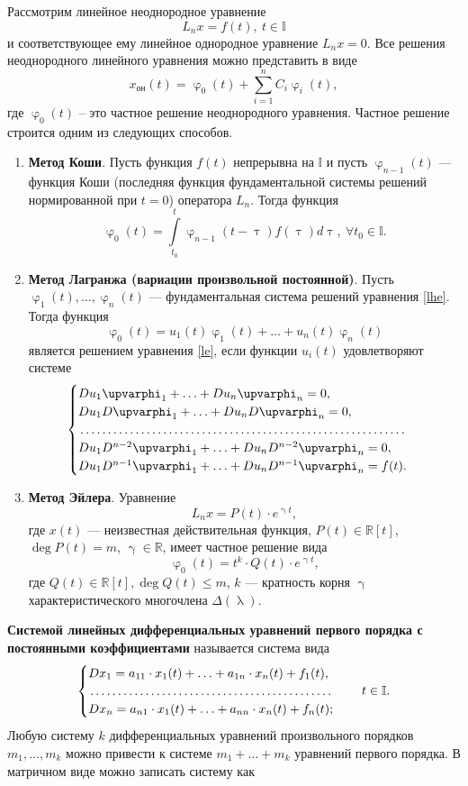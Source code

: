 \documentclass[a4paper, 12pt]{report}
\numberwithin{equation}{section}
\renewcommand{\varphi}{\upvarphi}
\renewcommand{\phi}{\upvarphi}
\renewcommand{\lambda}{\uplambda}
\begin{document}
	Рассмотрим линейное неоднородное уравнение 
	\begin{equation}
		\label{le}
		L_nx = f(t),\ t\in \mathbb{I}
	\end{equation} и соответствующее ему линейное однородное уравнение $L_nx = 0.$ Все решения неоднородного линейного уравнения можно представить в виде $$x_{\text{он}}(t) =\phi_0(t) + \sum_{i=1}^n C_i \phi_i(t),$$
	где $\phi_0(t)$ -- это частное решение неоднородного уравнения. Частное решение строится одним из следующих способов.
	\begin{enumerate}
		\item \textbf{Метод Коши}.
		Пусть функция $f(t)$ непрерывна на $\mathbb I$ и пусть $\varphi_{n-1}(t)$ --- функция Коши (последняя функция фундаментальной системы решений нормированной при $t=0$) оператора $L_n$. Тогда функция $$\phi_0(t) = \int\limits_{t_0}^{t}\varphi_{n-1}(t-\uptau) f(\uptau)d\uptau,\ \forall t_0 \in \mathbb I.$$
		\item \textbf{Метод Лагранжа (вариации произвольной постоянной)}.
		Пусть $\varphi_1(t),\ldots,\varphi_n(t)$ --- фундаментальная система решений уравнения \eqref{lhe}. Тогда функция $$\phi_0(t) = u_1(t)\varphi_1(t) + \ldots + u_n(t)\varphi_n(t)$$ является решением уравнения \eqref{le}, если функции $u_i(t)$ удовлетворяют системе $$\begin{cases}
			Du_1\varphi_1 + \ldots + Du_n\varphi_n = 0,\\
			Du_1D\varphi_1 + \ldots + Du_nD\varphi_n = 0,\\
			\dotfill\\
			Du_1D^{n-2}\varphi_1 + \ldots + Du_nD^{n-2}\varphi_n = 0,\\
			Du_1D^{n-1}\varphi_1 + \ldots + Du_nD^{n-1}\varphi_n = f(t).
		\end{cases}$$
		\item \textbf{Метод Эйлера}. Уравнение $$L_nx = P(t)\cdot e^{\upgamma t},$$ где $x(t)$ --- неизвестная действительная функция, $P(t)\in\mathbb R[t]$, $\deg P(t) = m$, $\upgamma \in \mathbb R$, имеет частное решение вида $$\phi_0(t) = t^k\cdot Q(t)\cdot e^{\upgamma t},$$ где $Q(t) \in \mathbb R[t], \deg Q(t) \leqslant m$, $k$ --- кратность корня $\upgamma$ характеристического многочлена $\Delta(\lambda)$.
	\end{enumerate}
	\textbf{Системой линейных дифференциальных уравнений первого порядка с постоянными коэффициентами} называется система вида
	$$\begin{cases}
		Dx_1=a_{11}\cdot x_1(t) + \ldots + a_{1n}\cdot x_n(t) + f_1(t),\\
		\dotfill\\
		Dx_n=a_{n1}\cdot x_1(t) + \ldots + a_{nn}\cdot x_n(t) + f_n(t);
	\end{cases}\quad t \in \mathbb I.$$ Любую систему $k$ дифференциальных уравнений произвольного порядков $m_1,\ldots, m_k$ можно привести к системе $m_1+\ldots + m_k$ уравнений первого порядка. В матричном виде можно записать систему как
\end{document}
